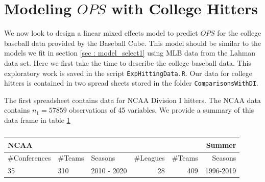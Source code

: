 \documentclass [52pt] {article}
\begin{document}
\section{Modeling $OPS$ with College Hitters}
We now look to design a  linear mixed effects model to predict $OPS$ for the college baseball data provided by the Baseball Cube.  This model should be similar to the models we fit in section  \ref{sec : model_select1} using MLB data from the Lahman data set.  Here we first take the time to describe the college baseball data.  This exploratory work is saved in the script \verb|ExpHittingData.R|.  Our data for college hitters is contained in two spread sheets stored in the folder \verb|ComparisonsWithDI|.  

The first spreadsheet contains data for NCAA Division I hitters.  The NCAA data contains $n_1 = 57859$ observations of 45 variables.  We provide a summary of this data frame in table \ref{tab : cdata_sum}
\begin{table}[h!]
\centering
\begin{tabular}{lllrrr}
  \hline
\multicolumn{3}{l}{NCAA}&\multicolumn{3}{r}{Summer}\\
  \hline
\#Conferences & \#Teams & Seasons  & \#Leagues & \#Teams & Seasons\\
\hline
35 & 310 & 2010 - 2020 & 28  & 409  & 1996-2019\\
\hline
\end{tabular}
\caption{\label{tab : cdata_sum}}
\end{table}
\end{document}
